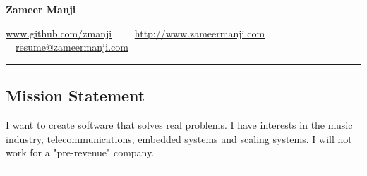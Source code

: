 \documentclass[10pt,letterpaper]{article}
\begin{document}
\begin{center}
{\huge \textbf{Zameer Manji}}


\href{http://www.github.com/zmanji/}{www.github.com/zmanji}\ \ \textbullet
\ \ \href{http://www.zameermanji.com}{http://www.zameermanji.com}\ \ \textbullet
\ \ \href{malto:resume@zameermanji.com}{resume@zameermanji.com}

\end{center}

\hrule
\vspace{-0.4em}
\subsection*{Mission Statement}
I want to create software that solves real problems. I have interests in the
music industry, telecommunications, embedded systems and scaling systems. I will
not work for a "pre-revenue" company.
\\

\hrule
\vspace{-0.4em}
\end{document}
